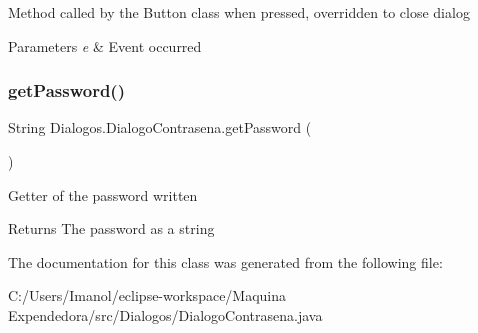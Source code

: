 Method called by the Button class when pressed, overridden to close dialog 
\begin{DoxyParams}{Parameters}
{\em e} & Event occurred \\
\hline
\end{DoxyParams}
\mbox{\label{class_dialogos_1_1_dialogo_contrasena_abf0758452b6d0029f6f633a28b3449fd}} 
\subsubsection{\texorpdfstring{get\+Password()}{getPassword()}}
{\footnotesize\ttfamily String Dialogos.\+Dialogo\+Contrasena.\+get\+Password (\begin{DoxyParamCaption}{ }\end{DoxyParamCaption})}

Getter of the password written \begin{DoxyReturn}{Returns}
The password as a string 
\end{DoxyReturn}


The documentation for this class was generated from the following file\+:\begin{DoxyCompactItemize}
\item 
C\+:/\+Users/\+Imanol/eclipse-\/workspace/\+Maquina Expendedora/src/\+Dialogos/Dialogo\+Contrasena.\+java\end{DoxyCompactItemize}
